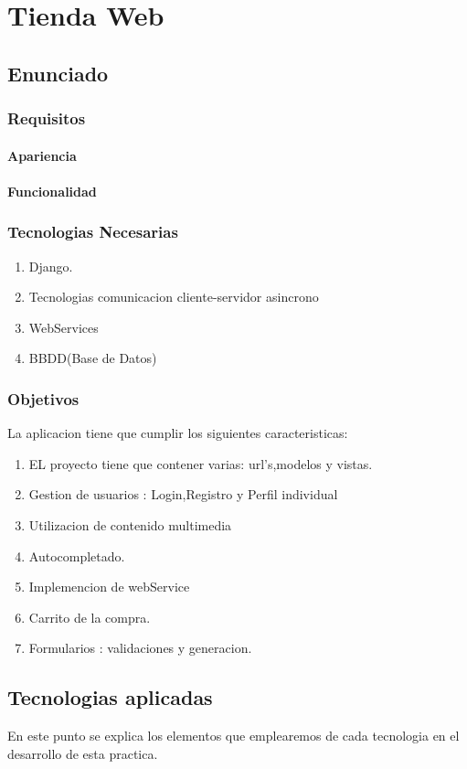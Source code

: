 
\chapter{Tienda Web} %
\section{Enunciado}
\subsection{Requisitos}
\subsubsection*{Apariencia}
\subsubsection*{Funcionalidad}
\subsection{Tecnologias Necesarias}
\begin{enumerate}
\item Django.
\item Tecnologias comunicacion cliente-servidor asincrono
\item WebServices
\item BBDD(Base de Datos)
\end{enumerate}
\subsection{Objetivos}
La aplicacion tiene que cumplir los siguientes caracteristicas:
\begin{enumerate}
\item EL proyecto tiene que contener varias: url's,modelos y vistas.
\item Gestion de usuarios : Login,Registro y Perfil individual
\item Utilizacion de contenido multimedia
\item Autocompletado.
\item Implemencion de webService
\item Carrito de la compra.
\item Formularios : validaciones y generacion.
\end{enumerate}
\section{Tecnologias aplicadas}
En este punto se explica los elementos que emplearemos de cada tecnologia en el desarrollo de esta practica.
